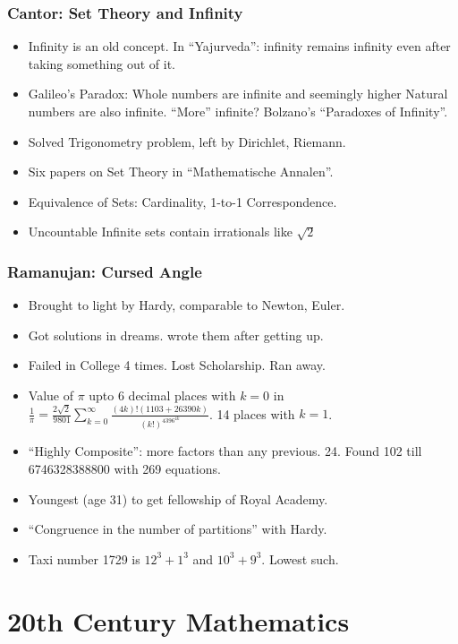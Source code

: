 \begin{frame}[fragile]
\frametitle{Cantor: Set Theory and Infinity}
\begin{itemize}
\item Infinity is an old concept. In ``Yajurveda'': infinity remains infinity even after taking something out of it.
\item Galileo's Paradox: Whole numbers are infinite and seemingly higher Natural numbers are also infinite. ``More'' infinite? Bolzano's ``Paradoxes of Infinity''.
\item Solved Trigonometry problem, left by Dirichlet, Riemann.
\item Six papers on Set Theory in ``Mathematische  Annalen''.
\item Equivalence of Sets: Cardinality, 1-to-1 Correspondence.
\item Uncountable Infinite sets contain irrationals like $\sqrt 2$
\end{itemize}
\end{frame}

\begin{frame}[fragile]
\frametitle{Ramanujan: Cursed Angle}
\begin{itemize}
\item Brought to light by Hardy, comparable to Newton, Euler.
\item Got solutions in dreams. wrote them after getting up.
\item Failed in College 4 times. Lost Scholarship. Ran away.
\item Value of $\pi$ upto 6 decimal places with $k=0$ in $\frac{1}{\pi} = \frac{2\sqrt 2}{9801} \sum \limits_{k=0}^{\infty} \frac{(4k)!(1103+26390k)}{(k!)^4396^{4k}}$. 14 places with $k=1$.
\item ``Highly Composite'': more factors than any previous. 24. Found 102 till 6746328388800 with 269 equations.
\item Youngest (age 31) to get fellowship of Royal Academy.
\item ``Congruence in the number of partitions'' with Hardy.
\item Taxi number 1729 is $12^3+1^3$ and  $10^3+9^3$. Lowest such.
\end{itemize}
\end{frame}


\section{20th Century Mathematics}

